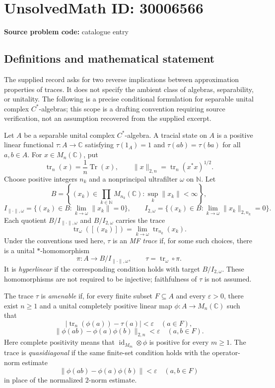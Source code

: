 \documentclass[11pt]{article}
\newcommand{\N}{\mathbb{N}}
\newcommand{\C}{\mathbb{C}}
\begin{document}
\section*{UnsolvedMath ID: 30006566}
\textbf{Source problem code:} catalogue entry
\subsection{Definitions and mathematical statement}
The supplied record asks for two reverse implications between approximation properties of traces. It does not specify the ambient class of algebras, separability, or unitality. The following is a precise conditional formulation for separable unital complex \(C^*\)-algebras; this scope is a drafting convention requiring source verification, not an assumption recovered from the supplied excerpt.

Let \(A\) be a separable unital complex \(C^*\)-algebra. A tracial state on \(A\) is a positive linear functional \(\tau:A\to\C\) satisfying \(\tau(1_A)=1\) and \(\tau(ab)=\tau(ba)\) for all \(a,b\in A\). For \(x\in M_n(\C)\), put
\[
\operatorname{tr}_n(x)=\frac{1}{n}\operatorname{Tr}(x),\qquad
\|x\|_{2,n}=\operatorname{tr}_n(x^*x)^{1/2}.
\]
Choose positive integers \(n_k\) and a nonprincipal ultrafilter \(\omega\) on \(\N\). Let
\[
B=\left\{(x_k)\in\prod_{k\in\N}M_{n_k}(\C):\sup_k\|x_k\|<\infty\right\},
\]
\[
I_{\|\cdot\|,\omega}=\{(x_k)\in B:\lim_{k\to\omega}\|x_k\|=0\},\qquad
I_{2,\omega}=\{(x_k)\in B:\lim_{k\to\omega}\|x_k\|_{2,n_k}=0\}.
\]
Each quotient \(B/I_{\|\cdot\|,\omega}\) and \(B/I_{2,\omega}\) carries the trace
\[
\operatorname{tr}_{\omega}([(x_k)])=\lim_{k\to\omega}\operatorname{tr}_{n_k}(x_k).
\]
Under the conventions used here, \(\tau\) is an \emph{MF trace} if, for some such choices, there is a unital \(*\)-homomorphism
\[
\pi:A\longrightarrow B/I_{\|\cdot\|,\omega},\qquad
\tau=\operatorname{tr}_{\omega}\circ\pi.
\]
It is \emph{hyperlinear} if the corresponding condition holds with target \(B/I_{2,\omega}\). These homomorphisms are not required to be injective; faithfulness of \(\tau\) is not assumed.

The trace \(\tau\) is \emph{amenable} if, for every finite subset \(F\subseteq A\) and every \(\varepsilon>0\), there exist \(n\geq1\) and a unital completely positive linear map \(\phi:A\to M_n(\C)\) such that
\[
|\operatorname{tr}_n(\phi(a))-\tau(a)|<\varepsilon\quad(a\in F),
\]
\[
\|\phi(ab)-\phi(a)\phi(b)\|_{2,n}<\varepsilon\quad(a,b\in F).
\]
Here complete positivity means that \(\operatorname{id}_{M_m}\otimes\phi\) is positive for every \(m\geq1\). The trace is \emph{quasidiagonal} if the same finite-set condition holds with the operator-norm estimate
\[
\|\phi(ab)-\phi(a)\phi(b)\|<\varepsilon\quad(a,b\in F)
\]
in place of the normalized \(2\)-norm estimate.
\end{document}
